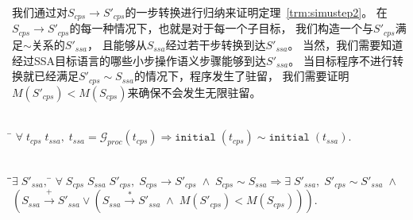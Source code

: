 我们通过对$S_{cps}\rightarrow S'_{cps}$的一步转换进行归纳来证明定理~\ref{trm:simustep2}。
在$S_{cps}\rightarrow S'_{cps}$的每一种情况下，也就是对于每一个子目标，
我们构造一个与$S'_{cps}$满足$\sim$关系的$S'_{ssa}$，
且能够从$S_{ssa}$经过若干步转换到达$S'_{ssa}$。
当然，我们需要知道经过SSA目标语言的哪些小步操作语义步骤能够到达$S'_{ssa}$。
当目标程序不进行转换就已经满足$S'_{cps}\sim S_{ssa}$的情况下，程序发生了驻留，
我们需要证明$M(S'_{cps})<M(S_{cps})$来确保不会发生无限驻留。

\begin{theorem}[CPS到SSA转换中初始状态的模拟]\label{def:fsimssa}
    \begin{tabbing}
      \\
        \quad\=\kill 
        \>$\forall\; t_{cps} \; t_{ssa},\;
        t_{ssa}=\mathcal{G}_{proc}(t_{cps})\Longrightarrow \mathtt{initial}\; (t_{cps})
        \sim \mathtt{initial}\; (t_{ssa}).$
    \end{tabbing}
  \end{theorem}

  \begin{theorem}[CPS到SSA转换中程序内部执行步骤的模拟]\label{trm:simustep2}
    \begin{tabbing}
      \\
    \quad\=\qquad\=$\exists\; S'_{ssa},\; $\=\kill
    \>$\forall \; S_{cps}\; S_{ssa}\; S'_{cps},\; S_{cps}\rightarrow S'_{cps}\; \wedge \; S_{cps}\sim S_{ssa} \Longrightarrow \exists\; S'_{ssa},\; S'_{cps}\sim S'_{ssa}\; \wedge$\\
    \>\>$(S_{ssa}\xrightarrow{+} S'_{ssa} \lor  (S_{ssa}\xrightarrow{*} S'_{ssa}\; \wedge \;  M(S'_{cps})<M(S_{cps})))$.
    \end{tabbing}
  \end{theorem}

